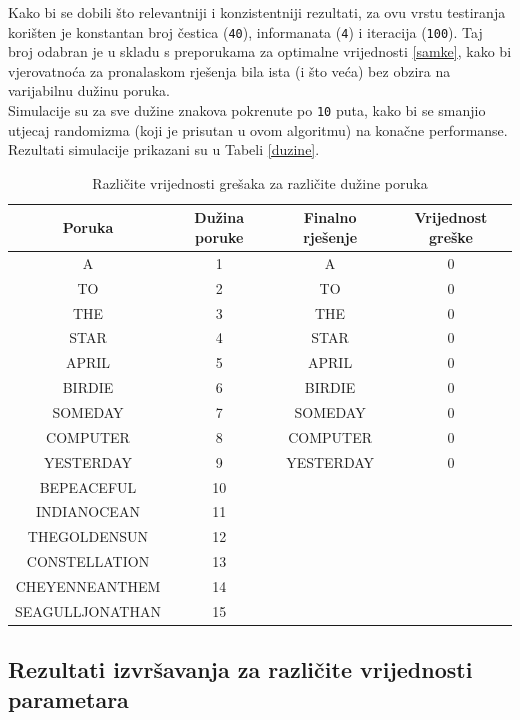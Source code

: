 \documentclass[12pt, a4paper]{article}
\begin{document}
Kako bi se dobili što relevantniji i konzistentniji rezultati, za ovu vrstu testiranja korišten je konstantan broj čestica (\texttt{40}), informanata (\texttt{4}) i iteracija (\texttt{100}). Taj broj odabran je u skladu s preporukama za optimalne vrijednosti \ref{samke}, kako bi vjerovatnoća za pronalaskom rješenja bila ista (i što veća) bez obzira na varijabilnu dužinu poruka. \\

Simulacije su za sve dužine znakova pokrenute po \texttt{10} puta, kako bi se smanjio utjecaj randomizma (koji je prisutan u ovom algoritmu) na konačne performanse. Rezultati simulacije prikazani su u Tabeli \ref{duzine}.

\begin{table}
\centering
\begin{tabular}{ | c | c | c | c |} \hline
\textbf{Poruka} 			& \textbf{Dužina poruke}	&{Finalno rješenje}			&{Vrijednost greške} \\ \hline
A 						& 1						& A 						& 0					\\ \hline
TO 						& 2						& TO 						& 0					\\ \hline
THE						& 3						& THE						& 0					\\ \hline
STAR					& 4						& STAR						& 0					\\ \hline
APRIL					& 5						& APRIL						& 0					\\ \hline
BIRDIE					& 6						& BIRDIE					& 0					\\ \hline
SOMEDAY				& 7						& SOMEDAY					& 0					\\ \hline
COMPUTER				& 8						& COMPUTER				& 0					\\ \hline
YESTERDAY				& 9						& YESTERDAY				& 0					\\ \hline
BEPEACEFUL				& 10					&							&					\\ \hline
INDIANOCEAN			& 11					&							&					\\ \hline
THEGOLDENSUN			& 12					&							&					\\ \hline
CONSTELLATION			& 13					&							&					\\ \hline
CHEYENNEANTHEM		& 14					&							&					\\ \hline
SEAGULLJONATHAN		& 15					&							&					\\ \hline
\end{tabular}
\caption{Različite vrijednosti grešaka za različite dužine poruka}
\label{poruke}
\end{table}

\subsection{Rezultati izvršavanja za različite vrijednosti parametara}
\end{document}

